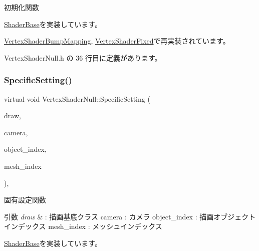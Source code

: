 初期化関数 



\mbox{\hyperlink{class_shader_base_a9622b2f5e0184a78d3af82820dc5113d}{Shader\+Base}}を実装しています。



\mbox{\hyperlink{class_vertex_shader_bump_mapping_a6c0f59d1f29fd883943a66bfe61b6b03}{Vertex\+Shader\+Bump\+Mapping}}, \mbox{\hyperlink{class_vertex_shader_fixed_ae829ff736b33c45543804059255125b6}{Vertex\+Shader\+Fixed}}で再実装されています。



 Vertex\+Shader\+Null.\+h の 36 行目に定義があります。

\mbox{\label{class_vertex_shader_null_aa2234c6ea083e3c0233d59f222145992}} 
\subsubsection{\texorpdfstring{Specific\+Setting()}{SpecificSetting()}}
{\footnotesize\ttfamily virtual void Vertex\+Shader\+Null\+::\+Specific\+Setting (\begin{DoxyParamCaption}\item[{\mbox{\hyperlink{class_draw_base}{Draw\+Base}} $\ast$}]{draw,  }\item[{\mbox{\hyperlink{class_camera}{Camera}} $\ast$}]{camera,  }\item[{unsigned}]{object\+\_\+index,  }\item[{unsigned}]{mesh\+\_\+index }\end{DoxyParamCaption})\hspace{0.3cm}{\ttfamily [inline]}, {\ttfamily [virtual]}}



固有設定関数 


\begin{DoxyParams}{引数}
{\em draw} & \+: 描画基底クラス camera \+: カメラ object\+\_\+index \+: 描画オブジェクトインデックス mesh\+\_\+index \+: メッシュインデックス \\
\hline
\end{DoxyParams}


\mbox{\hyperlink{class_shader_base_ac78c78ede3b8e48cf28b739b97456620}{Shader\+Base}}を実装しています。




